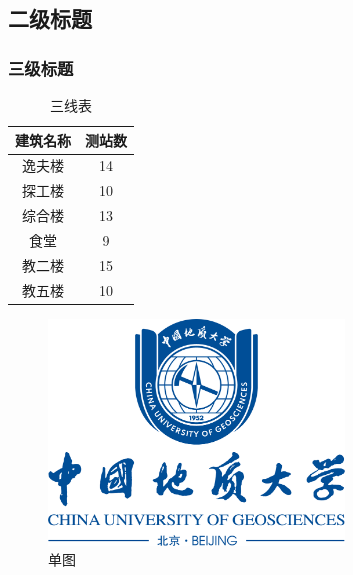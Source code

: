 \documentclass[12pt,a4paper]{article}
\begin{document}
\subsection{二级标题}

\subsubsection{三级标题}

\begin{table}[H]
    \centering
    \caption{\label{tab}三线表}
    \begin{tabular}{cc}
        \toprule
        建筑名称 & 测站数 \\
        \midrule
        逸夫楼   & 14     \\
        探工楼   & 10     \\
        综合楼   & 13     \\
        食堂     & 9      \\
        教二楼   & 15     \\
        教五楼   & 10     \\
        \bottomrule
    \end{tabular}
\end{table}

\begin{figure}[H]
    \centering
    \includegraphics[width=0.7\textwidth]{校徽与中英文（蓝色中轴式）.png}
    \caption{\label{fig:yif_std}单图}
\end{figure}
\end{document}
